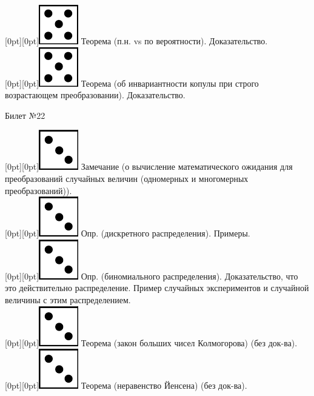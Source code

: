 \documentclass[10pt]{article}
\begin{document}
\raisebox{-1pt}[0pt][0pt]{\includegraphics[width=0.02\linewidth]{5.png}} Теорема (п.н. vs по вероятности). Доказательство. \\

\raisebox{-1pt}[0pt][0pt]{\includegraphics[width=0.02\linewidth]{5.png}} Теорема (об инвариантности копулы при строго возрастающем преобразовании). Доказательство. \\

\begin{center} {\Large Билет №22} \end{center} 

\raisebox{-1pt}[0pt][0pt]{\includegraphics[width=0.02\linewidth]{3.png}} Замечание (о вычисление  математического ожидания для преобразований случайных величин (одномерных и многомерных преобразований)). \\

\raisebox{-1pt}[0pt][0pt]{\includegraphics[width=0.02\linewidth]{3.png}} Опр. (дискретного распределения). Примеры. \\

\raisebox{-1pt}[0pt][0pt]{\includegraphics[width=0.02\linewidth]{3.png}}  Опр. (биномиального распределения). Доказательство, что это действительно распределение. Пример случайных экспериментов и случайной величины с этим распределением. \\     

\raisebox{-1pt}[0pt][0pt]{\includegraphics[width=0.02\linewidth]{3.png}} Теорема (закон больших чисел Колмогорова) (без док-ва). \\

\raisebox{-1pt}[0pt][0pt]{\includegraphics[width=0.02\linewidth]{3.png}} Теорема (неравенство Йенсена) (без док-ва). \\
\end{document}
